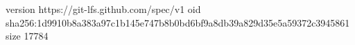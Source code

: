 version https://git-lfs.github.com/spec/v1
oid sha256:1d9910b8a383a97c1b145e747b8b0bd6bf9a8db39a829d35e5a59372c3945861
size 17784

